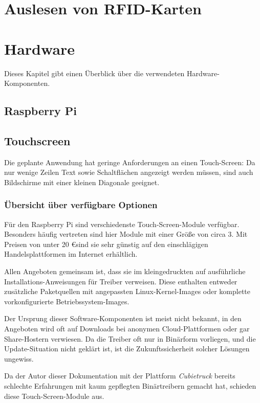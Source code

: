 \documentclass[11pt,a4paper]{IEEEtran} \usepackage[ngerman]{babel}
\begin{document}
\section{Auslesen von RFID-Karten} \label{sec:rfid}

\section{Hardware} \label{sec:hw}

Dieses Kapitel gibt einen Überblick über die verwendeten Hardware-Komponenten.

\subsection{Raspberry Pi}

\subsection{Touchscreen}

Die geplante Anwendung hat geringe Anforderungen an einen Touch-Screen: Da nur
wenige Zeilen Text sowie Schaltflächen angezeigt werden müssen, sind auch
Bildschirme mit einer kleinen Diagonale geeignet.

\subsubsection{Übersicht über verfügbare Optionen}

Für den Raspberry Pi sind verschiedenste Touch-Screen-Module verfügbar.
Besonders häufig vertreten sind hier Module mit einer Größe von circa
\SI{3}{\inch}. Mit Preisen von unter 20 \euro sind sie sehr günstig auf den
einschlägigen Handelsplattformen im Internet erhältlich.

Allen Angeboten gemeinsam ist, dass sie im kleingedruckten auf ausführliche
Installations-Anweisungen für Treiber verweisen. Diese enthalten entweder
zusätzliche Paketquellen mit angepassten Linux-Kernel-Images oder komplette
vorkonfigurierte Betriebssystem-Images. 

Der Ursprung dieser Software-Komponenten ist meist nicht bekannt, in den
Angeboten wird oft auf Downloads bei anonymen Cloud-Plattformen oder gar
Share-Hostern verwiesen. Da die Treiber oft nur in Binärform vorliegen, und die
Update-Situation nicht geklärt ist, ist die Zukunftssicherheit solcher Lösungen
ungewiss.

Da der Autor dieser Dokumentation mit der Plattform \emph{Cubietruck} bereits
schlechte Erfahrungen mit kaum gepflegten Binärtreibern gemacht hat, schieden
diese Touch-Screen-Module aus.
\end{document}
